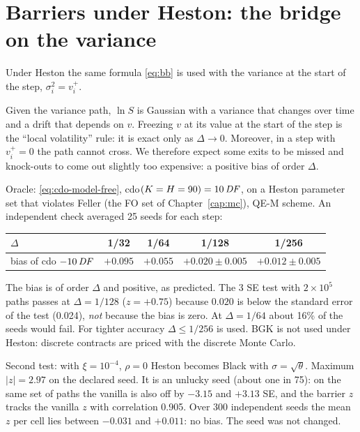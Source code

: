 \section{Barriers under Heston: the bridge on the variance}
Under Heston the same formula \eqref{eq:bb} is used with the variance at the start of the step, $\sigma_i^2=v_i^+$.
\begin{perche}[title={Why the bridge is not exact here}]
Given the variance path, $\ln S$ is Gaussian with a variance that changes over time and a drift that depends on $v$.
Freezing $v$ at its value at the start of the step is the ``local volatility'' rule: it is exact only as
$\Delta\to0$. Moreover, in a step with $v_i^+=0$ the path cannot cross. We therefore expect some exits to be missed
and knock-outs to come out slightly too expensive: a positive bias of order $\Delta$.
\end{perche}
\begin{progetto}[title={In the qpricer project: the measured residual bias}]
Oracle: \eqref{eq:cdo-model-free}, cdo$(K=H=90)=10\,\mathit{DF}$, on a Heston parameter set that violates Feller (the FO set
of Chapter~\ref{cap:mc}), QE-M scheme. An independent check averaged 25 seeds for each step:
\begin{center}
\small
\begin{tabular}{lcccc}
\toprule
$\Delta$ & 1/32 & 1/64 & 1/128 & 1/256\\
\midrule
bias of cdo $-10\,\mathit{DF}$ & $+0.095$ & $+0.055$ & $+0.020\pm0.005$ & $+0.012\pm0.005$\\
\bottomrule
\end{tabular}
\end{center}
The bias is of order $\Delta$ and positive, as predicted. The 3 SE test with $2\times10^5$ paths passes at
$\Delta=1/128$ ($z=+0.75$) because $0.020$ is below the standard error of the test (0.024), \emph{not} because the
bias is zero. At $\Delta=1/64$ about 16\% of the seeds would fail. For tighter accuracy $\Delta\le1/256$ is used.
BGK is not used under Heston: discrete contracts are priced with the discrete Monte Carlo.

\smallskip
Second test: with $\xi=10^{-4}$, $\rho=0$ Heston becomes Black with $\sigma=\sqrt\theta$. Maximum $|z|=2.97$ on the
declared seed. It is an unlucky seed (about one in 75): on the same set of paths the vanilla is also off by $-3.15$
and $+3.13$ SE, and the barrier $z$ tracks the vanilla $z$ with correlation 0.905. Over 300 independent seeds the mean
$z$ per cell lies between $-0.031$ and $+0.011$: no bias. The seed was not changed.
\end{progetto}

